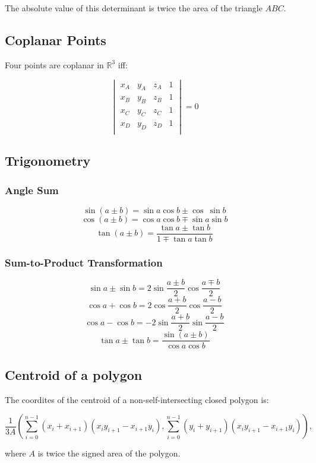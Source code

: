 The absolute value of this determinant is twice the area of the triangle $ABC$.

\subsection{Coplanar Points}

Four points are coplanar in $\mathbb{R}^3$ iff:

$$ \begin{vmatrix}
x_A & y_A & z_A & 1 \\
x_B & y_B & z_B & 1 \\
x_C & y_C & z_C & 1 \\
x_D & y_D & z_D & 1 \\
\end{vmatrix}  = 0 $$

\subsection{Trigonometry}

\subsubsection{Angle Sum}

$$ \sin(a \pm b) = \sin a \cos b \pm \cos \ \sin b $$
$$ \cos(a \pm b) = \cos a \cos b \mp \sin a \sin b $$
$$ \tan (a \pm b) = \frac{\tan a \pm \tan b}{1 \mp \tan a \tan b}$$

\subsubsection{Sum-to-Product Transformation}

$$ \sin a \pm \sin b = 2 \sin\frac{a \pm b}{2} \cos\frac{a \mp b}{2} $$
$$ \cos a + \cos b = 2 \cos\frac{a+b}{2} \cos\frac{a-b}{2} $$
$$ \cos a - \cos b = -2 \sin\frac{a+b}{2} \sin\frac{a-b}{2} $$
$$ \tan a \pm \tan b = \frac{\sin(a \pm b)}{\cos a \cos b} $$

\subsection{Centroid of a polygon}

The coordites of the centroid of a non-self-intersecting closed polygon is:

$$ \frac{1}{3A} \left(\sum_{i = 0}^{n-1}(x_i+x_{i+1})(x_iy_{i+1} - x_{i+1}y_i) , \sum_{i = 0}^{n-1}(y_i+y_{i+1})(x_iy_{i+1} - x_{i+1}y_i) \right), $$

where $A$ is twice the signed area of the polygon.
